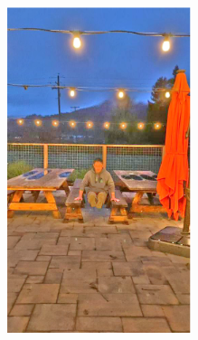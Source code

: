 \documentclass[letterpaper,12pt]{article}
\begin{document}
\begin{figure}[htbp]
\begin{subfigure}{0.128\textwidth}
			\includegraphics[width=\linewidth]{LoLi-Phone-imgT_1/ExCNet}
			\captionsetup{font=scriptsize}
			\caption{}
			\label{fig: LoLi-Phone-imgT_1_l}
		\end{subfigure}
		\begin{subfigure}{0.128\textwidth}

\end{subfigure}
\end{figure}
\end{document}
